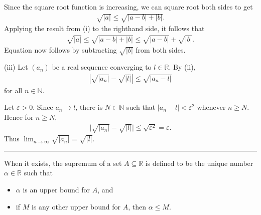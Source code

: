 \documentclass[letterpaper,10pt,english]{jupyterBook}
\begin{document}
\sphinxAtStartPar
Since the square root function is increasing, we can square root both sides to get
\begin{equation*}
\begin{split}
\sqrt{|a|} \leq \sqrt{|a-b|+|b|}.
\end{split}
\end{equation*}
\sphinxAtStartPar
Applying the result from (i) to the right\sphinxhyphen{}hand side, it follows that
\begin{equation*}
\begin{split}
\sqrt{|a|} \leq \sqrt{|a-b|+|b|} \leq \sqrt{|a-b|}+\sqrt{|b|}.
\end{split}
\end{equation*}
\sphinxAtStartPar
Equation {\hyperref[\detokenize{Solutions-upto6:equation-eq-sqrta-sqrtb}]{}} now follows by subtracting \(\sqrt{|b|}\) from both sides.

\sphinxAtStartPar
(iii) Let \((a_n)\) be a real sequence converging to \(l\in\mathbb{R}\). By (ii),
\begin{equation*}
\begin{split}
\left|\sqrt{|a_{n}|}-\sqrt{|l|}\right| \leq \sqrt{\big|a_n-l\big|}
\end{split}
\end{equation*}
\sphinxAtStartPar
for all \(n\in\mathbb{N}\).

\sphinxAtStartPar
Let \(\varepsilon>0\). Since \(a_n\rightarrow l\), there is \(N\in\mathbb{N}\) such that \(|a_n-l|<\varepsilon^2\) whenever \(n\geq N\). Hence for \(n\geq N\),
\begin{equation*}
\begin{split}
\big|\sqrt{|a_{n}|}-\sqrt{|l|}\big| \leq \sqrt{\varepsilon^2} = \varepsilon.
\end{split}
\end{equation*}
\sphinxAtStartPar
Thus \(\displaystyle\lim_{n\rightarrow\infty}\sqrt{|a_n|} = \sqrt{|l|}\).


\bigskip\hrule\bigskip


\sphinxAtStartPar
{\hyperref[\detokenize{Problems:p5}]{}} When it exists, the supremum of a set \(A\subseteq\mathbb{R}\) is defined to be the unique number \(\alpha\in\mathbb{R}\) such that
\begin{itemize}
\item {} 
\sphinxAtStartPar
\(\alpha\) is an upper bound for \(A\), and

\item {} 
\sphinxAtStartPar
if \(M\) is any other upper bound for \(A\), then \(\alpha\leq M\).

\end{itemize}
\end{document}
